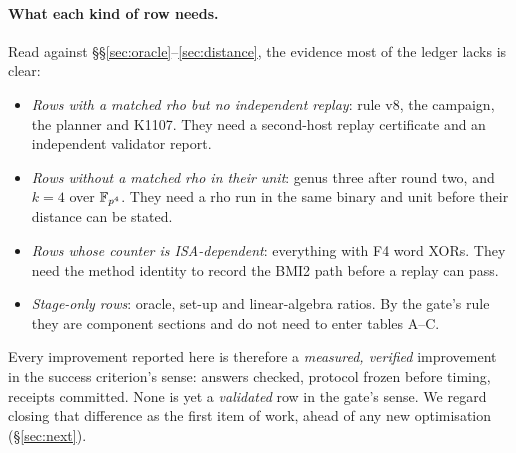 \paragraph{What each kind of row needs.} Read against
\S\S\ref{sec:oracle}--\ref{sec:distance}, the evidence most of the ledger
lacks is clear:
\begin{itemize}
\item \emph{Rows with a matched rho but no independent replay}: rule v8,
  the campaign, the planner and K1107. They need a second-host replay
  certificate and an independent validator report.
\item \emph{Rows without a matched rho in their unit}: genus three after
  round two, and $k=4$ over $\mathbb{F}_{p^4}$. They need a rho run in the same
  binary and unit before their distance can be stated.
\item \emph{Rows whose counter is ISA-dependent}: everything with F4 word
  XORs. They need the method identity to record the BMI2 path before a
  replay can pass.
\item \emph{Stage-only rows}: oracle, set-up and linear-algebra ratios. By
  the gate's rule they are component sections and do not need to enter
  tables A--C.
\end{itemize}
Every improvement reported here is therefore a \emph{measured, verified}
improvement in the success criterion's sense: answers checked, protocol
frozen before timing, receipts committed. None is yet a \emph{validated}
row in the gate's sense. We regard closing that difference as the first
item of work, ahead of any new optimisation (\S\ref{sec:next}).

